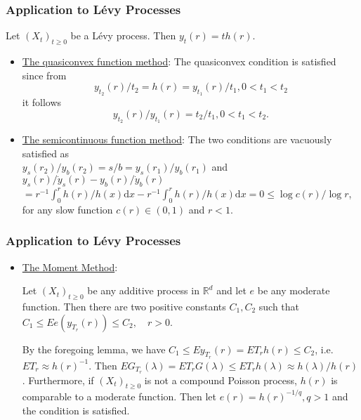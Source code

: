 \documentclass[12pt]{beamer}
\def\RR{\mathbb{R}}
\def\d{\mathrm{d}}
\begin{document}
\begin{frame}
	\frametitle{Application to L\'evy Processes}
	Let $(X_t)_{t\ge0}$ be a L\'evy process. Then $y_t(r)=th(r)$.
	\vspace{1ex}
	\pause
	\begin{itemize}
		\item \underline{The quasiconvex function method}: The quasiconvex condition \hyperlink{quasiconvex}{} is satisfied since from 
			\vspace{-1ex}
			$$
			y_{t_2}(r)/t_2 = h(r) = y_{t_1}(r)/t_1,0<t_1<t_2
			$$ 
			\vspace{-1ex}
			it follows 
			\vspace{-1ex}
			$$
			y_{t_2}(r)/y_{t_1}(r)=t_2/t_1,0<t_1<t_2.
			$$
			\vspace{-2.5ex}
			\pause
		\item \underline{The semicontinuous function method}: The two conditions \hyperlink{semicontinuous}{} are vacuously satisfied as \\[0.5ex] 
			$y_s(r_2)/y_b(r_2) = s/b = y_s(r_1)/y_b(r_1)$ \qquad and \\[0.5ex]
			$y_s(r)/\dot y_s(r) - y_b(r)/\dot y_b(r)$\\[0.8ex]
			$= r^{-1} \int_0^r h(r)/h(x)\d x - r^{-1} \int_0^r h(r)/h(x)\d x = 0 \le \log c(r) / \log r$,\\[0.5ex]
			for any slow function $c(r)\in (0,1)$ and $r<1$.
	\end{itemize}
\end{frame}
\begin{frame}
	\frametitle{Application to L\'evy Processes}
	\begin{itemize}
		\item \underline{The Moment Method}: 
			\begin{lemma}
				Let $(X_t)_{t\ge0}$ be any additive process in $\RR^d$ and let $e$ be any moderate function. Then there are two positive constants $C_1,C_2$ such that $C_1\le Ee(y_{T_r}(r))\le C_2,\quad r>0$.
			\end{lemma}
			By the foregoing lemma, we have $C_1 \le Ey_{T_r}(r)=ET_rh(r) \le C_2$, i.e.\ $ET_r\approx h(r)^{-1}$. Then $EG_{T_r}(\lambda) = ET_rG(\lambda)\le ET_rh(\lambda) \approx h(\lambda)/h(r)$. Furthermore, if $(X_t)_{t\ge0}$ is not a compound Poisson process, $h(r)$ is comparable to a moderate function. Then let $e(r)=h(r)^{-1/q},q>1$ and the condition \hyperlink{momentmethod}{} is satisfied.
	\end{itemize}
\end{frame}
\end{document}
